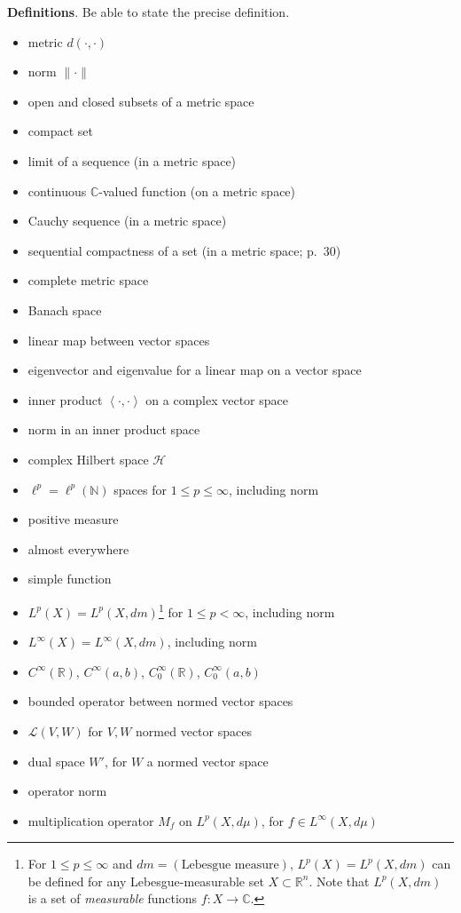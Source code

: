 \documentclass[12pt]{amsart}
\newcommand{\bigspacing}{\renewcommand{\baselinestretch}{1.21}\tiny\normalsize}
\newcommand{\cH}{\mathcal{H}}
\newcommand{\cL}{\mathcal{L}}
\newcommand{\CC}{{\mathbb{C}}}
\newcommand{\RR}{{\mathbb{R}}}
\newcommand{\NN}{{\mathbb{N}}}
\newcommand{\ip}[2]{\left<#1,#2\right>}
\begin{document}
\bigspacing
\noindent \textbf{Definitions}.  Be able to state the precise definition.
\begin{itemize}
\item metric $d(\cdot,\cdot)$
\item norm $\|\cdot\|$
\item open and closed subsets of a metric space
\item compact set
\item limit of a sequence (in a metric space)
\item continuous $\CC$-valued function (on a metric space)
\item Cauchy sequence (in a metric space)
\item sequential compactness of a set (in a metric space; p.~30)
\item complete metric space
\item Banach space
\item linear map between vector spaces
\item eigenvector and eigenvalue for a linear map on a vector space
\item inner product $\ip{\cdot}{\cdot}$ on a complex vector space
\item norm in an inner product space
\item complex Hilbert space $\cH$
\item $\ell^p=\ell^p(\NN)$ spaces for $1\le p \le \infty$, including norm
\item positive measure
\item almost everywhere
\item simple function
\item $L^p(X)=L^p(X,dm)$\footnote{For $1\le p \le \infty$ and $dm=(\text{Lebesgue measure})$, $L^p(X)=L^p(X,dm)$ can be defined for any Lebesgue-measurable set $X\subset \RR^n$.  Note that $L^p(X,dm)$ is a set of \emph{measurable} functions $f:X\to\CC$.} for $1\le p < \infty$, including norm
\item $L^\infty(X)=L^\infty(X,dm)$, including norm
\item $C^\infty(\RR)$, $C^\infty(a,b)$, $C_0^\infty(\RR)$, $C_0^\infty(a,b)$
\item bounded operator between normed vector spaces
\item $\cL(V,W)$ for $V,W$ normed vector spaces
\item dual space $W'$, for $W$ a normed vector space
\item operator norm
\item multiplication operator $M_f$ on $L^p(X,d\mu)$, for $f\in L^\infty(X,d\mu)$

\end{itemize}
\end{document}

